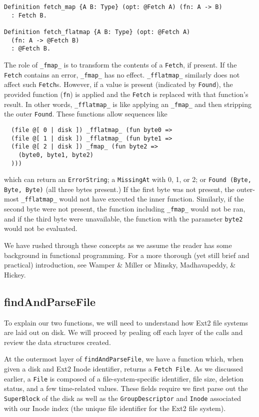 \documentclass[nocopyrightspace]{sigplanconf}
\begin{document}
\begin{lstlisting}
Definition fetch_map {A B: Type} (opt: @Fetch A) (fn: A -> B)
  : Fetch B.

Definition fetch_flatmap {A B: Type} (opt: @Fetch A) 
  (fn: A -> @Fetch B)
  : @Fetch B.
\end{lstlisting}

The role of {\tt \_fmap\_} is to transform the contents of a {\tt Fetch}, if
present. If the {\tt Fetch} contains an error, {\tt \_fmap\_} has no effect.
{\tt \_fflatmap\_} similarly does not affect such {\tt Fetch}s. However, if a
value is present (indicated by {\tt Found}), the provided function ({\tt fn})
is applied and the {\tt Fetch} is replaced with that function's result. In
other words, {\tt \_fflatmap\_} is like applying an {\tt \_fmap\_} and then
stripping the outer {\tt Found}. These functions allow sequences like

\begin{lstlisting}
  (file @[ 0 | disk ]) _fflatmap_ (fun byte0 =>
  (file @[ 1 | disk ]) _fflatmap_ (fun byte1 =>
  (file @[ 2 | disk ]) _fmap_ (fun byte2 =>
    (byte0, byte1, byte2)
  )))
\end{lstlisting}

which can return an {\tt ErrorString}; a {\tt MissingAt} with 0, 1, or 2; or
{\tt Found (Byte, Byte, Byte)} (all three bytes present.) If the first byte
was not present, the outer-most {\tt \_fflatmap\_} would not have executed the
inner function. Similarly, if the second byte were not present, the function
including {\tt \_fmap\_} would not be ran, and if the third byte were
unavailable, the function with the parameter {\tt byte2} would not be
evaluated.

We have rushed through these concepts as we assume the reader has some
background in functional programming. For a more thorough (yet still brief and
practical) introduction, see Wamper \& Miller\cite{scala} or Minsky,
Madhavapeddy, \& Hickey\cite{ocaml}.

\subsection{findAndParseFile}

To explain our two functions, we will need to understand how Ext2 file systems
are laid out on disk. We will proceed by pealing off each layer of the calls
and review the data structures created.

At the outermost layer of {\tt findAndParseFile}, we have a function which,
when given a disk and Ext2 Inode identifier, returns a {\tt Fetch File}. As we
discussed earlier, a {\tt File} is composed of a file-system-specific
identifier, file size, deletion status, and a few time-related values.  These
fields require we first parse out the {\tt SuperBlock} of the disk as well as
the {\tt GroupDescriptor} and {\tt Inode} associated with our Inode index (the
unique file identifier for the Ext2 file system).
\end{document}
